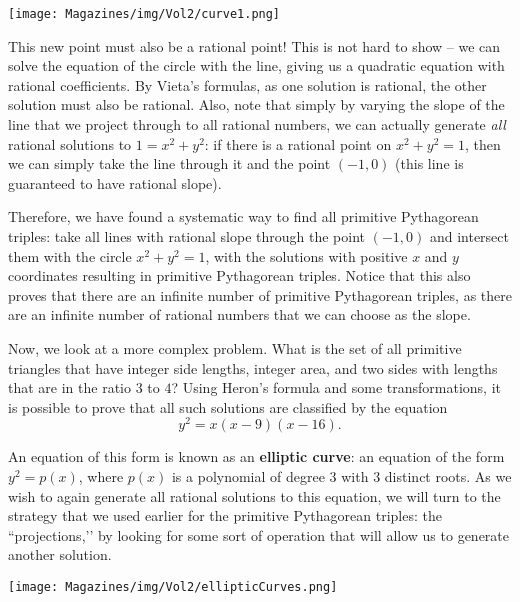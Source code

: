 \documentclass{article}
\begin{document}
\begin{multicols}{3}
\begin{center}
\texttt{[image: Magazines/img/Vol2/curve1.png]}
\end{center}

This new point must also be a rational point! This is not hard to show – we can solve the equation of the circle with the line, giving us a quadratic equation with rational coefficients. By Vieta’s formulas, as one solution is rational, the other solution must also be rational. Also, note that simply by varying the slope of the line that we project through to all rational numbers, we can actually generate \textit{all} rational solutions to $1=x^2+y^2$: if there is a rational point on $x^2+y^2=1$, then we can simply take the line through it and the point $(-1, 0)$ (this line is guaranteed to have rational slope).

Therefore, we have found a systematic way to find all primitive Pythagorean triples: take all lines with rational slope through the point $(-1, 0)$ and intersect them with the circle $x^2+y^2=1$, with the solutions with positive $x$ and $y$ coordinates resulting in primitive Pythagorean triples. Notice that this also proves that there are an infinite number of primitive Pythagorean triples, as there are an infinite number of rational numbers that we can choose as the slope.

Now, we look at a more complex problem. What is the set of all primitive triangles that have integer side lengths, integer area, and two sides with lengths that are in the ratio $3$ to $4$? Using Heron’s formula and some transformations, it is possible to prove that all such solutions are classified by the equation
\[y^2=x(x-9)(x-16).\]


An equation of this form is known as an \textbf{elliptic curve}: an equation of the form $y^2=p(x)$, where $p(x)$ is a polynomial of degree $3$ with $3$ distinct roots. As we wish to again generate all rational solutions to this equation, we will turn to the strategy that we used earlier for the primitive Pythagorean triples: the ``projections,’’ by looking for some sort of operation that will allow us to generate another solution.

\begin{center}
    \texttt{[image: Magazines/img/Vol2/ellipticCurves.png]}
\end{center}


\end{multicols}
\end{document}
